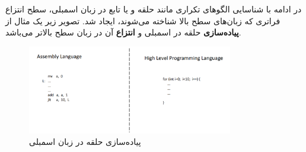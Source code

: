 \begin{flushright}
    در ادامه با شناسایی الگوهای تکراری مانند حلقه و یا تابع در زبان اسمبلی، سطح انتزاع فراتری که زبان‌های سطح بالا شناخته می‌شوند، ایجاد شد.
    تصویر زیر یک مثال از \textbf{پیاده‌سازی} حلقه در اسمبلی و \textbf{انتزاع} آن در زبان سطح بالاتر می‌باشد.

    \begin{figure}[H]
        \centering
        \includegraphics[width=0.8\textwidth]{source/high-level-programming-language-imp&abs}
        \caption{پیاده‌سازی حلقه در زبان اسمبلی}
        \label{fig:for-in-assembly}
    \end{figure}
\end{flushright}